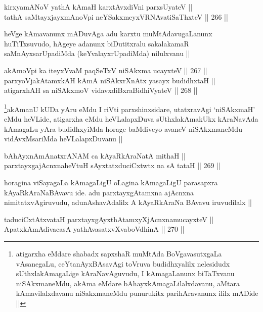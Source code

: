 \begin{shl}
kirxyamANoV yathA kAmaH karxtAvxdiVni parxsUyateV || \\
tathA saMtayxjayxmAnoV\s pi neYSakxmeyxVRNAvatiSaThxteV ||  266 ||  
\end{shl}

\begin{artha}
heVge kAmavanunx mADuvAga adu karxtu muMtAdavugaLanunx huTiTxsuvudo,
hAgeye adanunx biDutitxralu sakalakamaR saMnAyxsarUpadiMda
(keYvalayxrUpadiMda) nilulxvanu ||
\end{artha}


\begin{shl}
akAmoV\s pi ka iteyxVvaM paqSeTxV niSAkxma ucayxteV ||  267 ||  \\
parxyoVjakAtamxkAH kAmA niSAkxrXnAtx yasayx budidhxtaH || \\
atigarxhAH sa niSAkxmoV vidavxdiBxraBidhiVyateV ||  268 ||  
\end{shl}

\begin{artha}
\footnote{atigarxha eMdare shabadx sapxshaR muMtAda BoVgavasutxgaLa
  vAsanegaLu, ceYtanAyxBAsavAgi toVruva budidhxyalilx nelesidudx
  sUthxlakAmagaLige kAraNavAguvudu, I kAmagaLanunx biTaTxvanu
  niSAkxmaneMdu, akAma eMdare bAhayxkAmagaLilalxdavanu, aMtara
  kAmavilalxdavanu niSakxmaneMdu punurukitx parihAravanunx ililx
  mADide ||}akAmanU kUDa yAru eMdu I riVti parxshinxsidare, utatxravAgi
`niSAkxmaH' eMdu heVLide, atigarxha eMdu heVLalapxDuva sUthxlakAmakUkx
kAraNavAda kAmagaLu yAra budidhxyiMda horage baMdiveyo avaneV
niSAkxmaneMdu vidAvxMsariMda heVLalapxDuvanu ||
\end{artha}

\begin{shl}
bAhAyxnAmAnatxrANAM ca kAyaRkAraNatA mithaH || \\
parxtayxgajAcnxnaheVtuH sAyxtatxduciCxtwtx na sA tataH ||  269 ||  
\end{shl}

\begin{artha}
horagina viSayagaLa kAmagaLigU oLagina kAmagaLigU parasapxra
kAyaRkAraNaBAvavu ide. adu parxtayxgAtamxna ajAcnxna
nimitatxvAgiruvudu, adunAshavAdalilx A kAyaRkAraNa BAvavu iruvudilalx ||
\end{artha}


\begin{shl}
taduciCxtAtxvataH parxtayxgAyxthAtamxyXjAcnxnamucayxteV || \\
ApatxkAmAdivacasA yathAvasatxvXvaboVdhinA ||  270 ||  
\end{shl}

